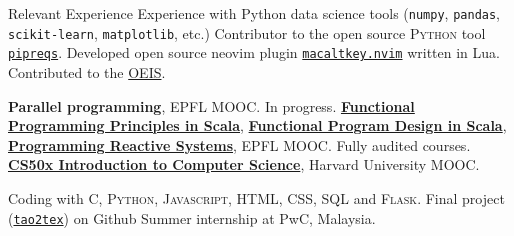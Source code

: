 
\begin{rubric}{Relevant Experience}
  \entry*[2023] Experience with Python data science tools (\texttt{numpy}, \texttt{pandas}, \texttt{scikit-learn}, \texttt{matplotlib}, etc.)
  \entry*[2023] Contributor to the open source \textsc{Python} tool \href{https://github.com/bndr/pipreqs}{\texttt{pipreqs}}. 
  \entry*[2023] Developed open source neovim plugin \href{https://github.com/clvnkhr/macaltkey.nvim}{\texttt{macaltkey.nvim}} written in Lua.
  \entry*[2023] Contributed to the \href{https://oeis.org/A364354}{\textsc{OEIS}}.

\entry*[2023] \textbf{Parallel programming}, EPFL MOOC. In progress.
\entry*[2022]  \href{https://www.coursera.org/learn/scala-functional-programming/}{\textbf{Functional Programming Principles in Scala}},  \href{https://www.coursera.org/learn/scala-functional-program-design/}{\textbf{Functional Program Design in Scala}}, \href{https://www.coursera.org/learn/scala-akka-reactive/}{\textbf{Programming Reactive Systems}}, EPFL MOOC. Fully audited courses.
\entry*[2022] \href{https://certificates.cs50.io/61d7b5aa-582d-49e7-ada4-c7cd0b965c9b.pdf?size=letter}{\textbf{CS50x Introduction to Computer Science}}, Harvard University MOOC. \par Coding with \textsc{C, Python, Javascript, HTML, CSS, SQL} and \textsc{Flask}. Final project (\href{https://github.com/clvnkhr/tao2tex}{\texttt{tao2tex}}) on Github
\entry*[2015] Summer internship at PwC, Malaysia.
%


\end{rubric}
